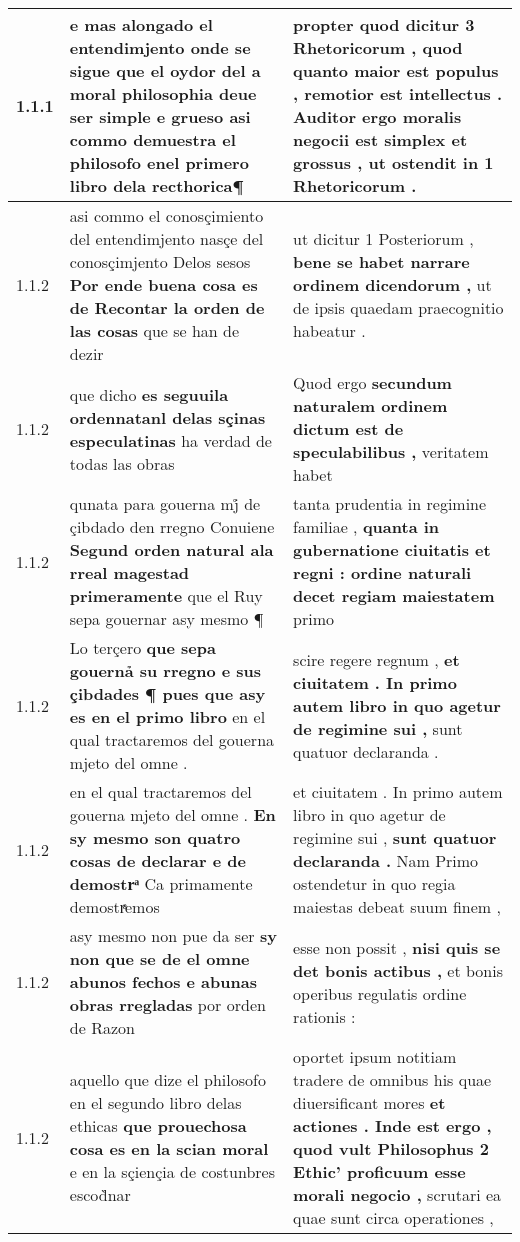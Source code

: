 \begin{tabular}{|p{1cm}|p{6.5cm}|p{6.5cm}|}
1.1.1 & e mas alongado el entendimjento onde se sigue \textbf{ que el oydor del a moral philosophia deue ser simple e grueso } asi commo demuestra el philosofo enel primero libro dela recthorica¶ & propter quod dicitur 3 Rhetoricorum , \textbf{ quod quanto maior est populus , remotior est intellectus . Auditor ergo moralis negocii est simplex et grossus , } ut ostendit in 1 Rhetoricorum . \\\hline
1.1.2 & asi commo el conosçimiento del entendimjento nasçe del conosçimjento Delos sesos \textbf{ Por ende buena cosa es de Recontar la orden de las cosas } que se han de dezir & ut dicitur 1 Posteriorum , \textbf{ bene se habet narrare ordinem dicendorum , } ut de ipsis quaedam praecognitio habeatur . \\\hline
1.1.2 & que dicho \textbf{ es seguuila ordennatanl delas sçinas especulatinas } ha verdad de todas las obras & Quod ergo \textbf{ secundum naturalem ordinem dictum est de speculabilibus , } veritatem habet \\\hline
1.1.2 & qunata para gouerna mj̊ de çibdado den rregno Conuiene \textbf{ Segund orden natural ala rreal magestad primeramente } que el Ruy sepa gouernar asy mesmo ¶ & tanta prudentia in regimine familiae , \textbf{ quanta in gubernatione ciuitatis et regni : ordine naturali decet regiam maiestatem } primo \\\hline
1.1.2 & Lo terçero \textbf{ que sepa gouernả su rregno e sus çibdades ¶ pues que asy es en el primo libro } en el qual tractaremos del gouerna mjeto del omne . & scire regere regnum , \textbf{ et ciuitatem . In primo autem libro in quo agetur de regimine sui , } sunt quatuor declaranda . \\\hline
1.1.2 & en el qual tractaremos del gouerna mjeto del omne . \textbf{ En sy mesmo son quatro cosas de declarar e de demostrͣ } Ca primamente demostrͣemos & et ciuitatem . In primo autem libro in quo agetur de regimine sui , \textbf{ sunt quatuor declaranda . } Nam Primo ostendetur in quo regia maiestas debeat suum finem , \\\hline
1.1.2 & asy mesmo non pue da ser \textbf{ sy non que se de el omne abunos fechos e abunas obras rregladas } por orden de Razon & esse non possit , \textbf{ nisi quis se det bonis actibus , } et bonis operibus regulatis ordine rationis : \\\hline
1.1.2 & aquello que dize el philosofo en el segundo libro delas ethicas \textbf{ que prouechosa cosa es en la scian moral } e en la sçiençia de costunbres escod̀nar & oportet ipsum notitiam tradere de omnibus his quae diuersificant mores \textbf{ et actiones . Inde est ergo , quod vult Philosophus 2 Ethic’ proficuum esse morali negocio , } scrutari ea quae sunt circa operationes , \\\hline

\end{tabular}
